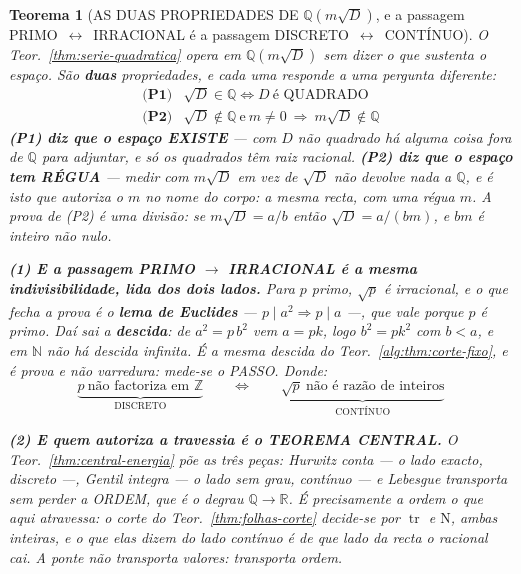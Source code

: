 \documentclass[11pt,a4paper]{article}
\newtheorem{teorema}{Teorema}
\begin{document}
\begin{teorema}[AS DUAS PROPRIEDADES DE $\mathbb{Q}(m\sqrt D)$, e a passagem
PRIMO~$\leftrightarrow$~IRRACIONAL é a passagem DISCRETO~$\leftrightarrow$~CONTÍNUO]%
\label{thm:duas-propriedades}
O Teor.~\ref{thm:serie-quadratica} opera em $\mathbb{Q}(m\sqrt D)$ sem dizer o que sustenta
o espaço. São \textbf{duas} propriedades, e cada uma responde a uma pergunta diferente:
\[
\boxed{
\begin{array}{ll}
\textbf{(P1)} & \sqrt D\in\mathbb{Q}\iff D\ \text{é QUADRADO}\\[3pt]
\textbf{(P2)} & \sqrt D\notin\mathbb{Q}\ \text{e}\ m\neq0\ \Longrightarrow\
m\sqrt D\notin\mathbb{Q}
\end{array}}
\]
\textbf{(P1) diz que o espaço EXISTE} --- com $D$ não quadrado há alguma coisa fora de
$\mathbb{Q}$ para adjuntar, e \emph{só os quadrados têm raiz racional}. \textbf{(P2) diz
que o espaço tem RÉGUA} --- medir com $m\sqrt D$ em vez de $\sqrt D$ não devolve nada a
$\mathbb{Q}$, e é isto que autoriza o $m$ no nome do corpo: \emph{a mesma recta, com uma
régua $m$}. A prova de (P2) é uma divisão: se $m\sqrt D=a/b$ então $\sqrt D=a/(bm)$, e
$bm$ é inteiro não nulo.

\textbf{(1) E a passagem PRIMO $\to$ IRRACIONAL é a mesma indivisibilidade, lida dos dois
lados.} Para $p$ primo, $\sqrt p$ é irracional, e o que fecha a prova é o \textbf{lema de
Euclides} --- $p\mid a^{2}\Rightarrow p\mid a$ ---, que vale \emph{porque} $p$ é primo. Daí
sai a \textbf{descida}: de $a^{2}=p\,b^{2}$ vem $a=pk$, logo $b^{2}=pk^{2}$ com $b<a$, e em
$\mathbb{N}$ não há descida infinita. \emph{É a mesma descida do Teor.~\ref{alg:thm:corte-fixo},
e é prova e não varredura: mede-se o PASSO.} Donde:
\[
\underbrace{p\ \text{não factoriza em }\mathbb{Z}}_{\text{DISCRETO}}
\qquad\Longleftrightarrow\qquad
\underbrace{\sqrt p\ \text{não é razão de inteiros}}_{\text{CONTÍNUO}}
\]

\textbf{(2) E quem autoriza a travessia é o TEOREMA CENTRAL.} O
Teor.~\ref{thm:central-energia} põe as três peças: \emph{Hurwitz conta} --- o lado exacto,
discreto ---, \emph{Gentil integra} --- o lado sem grau, contínuo --- e \emph{Lebesgue
transporta sem perder a ORDEM}, que é o degrau $\mathbb{Q}\to\mathbb{R}$. É precisamente a
ordem o que aqui atravessa: o corte do Teor.~\ref{thm:folhas-corte} decide-se por
$\operatorname{tr}$ e $\mathrm{N}$, ambas inteiras, e o que elas dizem do lado contínuo é de
que lado da recta o racional cai. \emph{A ponte não transporta valores: transporta ordem.}


\end{teorema}
\end{document}
